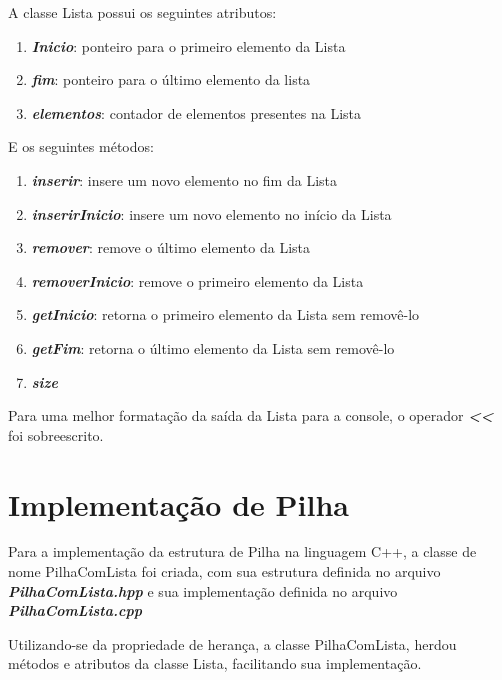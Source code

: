 \documentclass[rascunho,xindy,sublist]{fei}
\begin{document}
A classe Lista possui os seguintes atributos:

\begin{enumerate}
  \item \textbf{\textit{Inicio}}: ponteiro para o primeiro elemento da Lista 
  \item \textbf{\textit{fim}}: ponteiro para o último elemento da lista
  \item \textbf{\textit{elementos}}: contador de elementos presentes na Lista
\end{enumerate}

E os seguintes métodos:

\begin{enumerate}
  \item \textbf{\textit{inserir}}: insere um novo elemento no fim da Lista
  \item \textbf{\textit{inserirInicio}}: insere um novo elemento no início da Lista
  \item \textbf{\textit{remover}}: remove o último elemento da Lista
  \item \textbf{\textit{removerInicio}}: remove o primeiro elemento da Lista
  \item \textbf{\textit{getInicio}}: retorna o primeiro elemento da Lista sem removê-lo
  \item \textbf{\textit{getFim}}: retorna o último elemento da Lista sem removê-lo
  \item \textbf{\textit{size}}
\end{enumerate}

Para uma melhor formatação da saída da Lista para a console, o operador \textbf{\textit{<<}} foi sobreescrito.

\section{Implementação de Pilha}

Para a implementação da estrutura de Pilha na linguagem C++, a classe de nome PilhaComLista foi criada, com sua estrutura definida no arquivo \textbf{\textit{PilhaComLista.hpp}} e sua implementação definida no arquivo \textbf{\textit{PilhaComLista.cpp}}

Utilizando-se da propriedade de herança, a classe PilhaComLista, herdou métodos e atributos da classe Lista, facilitando sua implementação.
\end{document}
